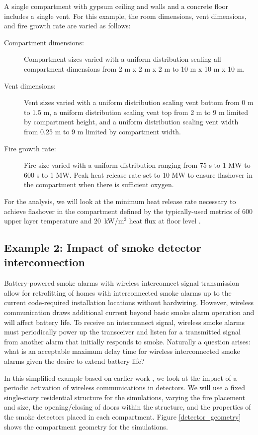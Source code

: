 \documentclass[12pt,twoside]{book}
\begin{document}
A single compartment with gypsum ceiling and walls and a concrete floor includes a single vent. For this example, the room dimensions, vent dimensions, and fire growth rate are varied as follows:

\begin{description}
\item[Compartment dimensions:] Compartment sizes varied with a uniform distribution scaling all compartment dimensions from 2 m x 2 m x 2 m to 10 m x 10 m x 10 m.
\item[Vent dimensions:] Vent sizes varied with a uniform distribution scaling vent bottom from 0 m to 1.5 m, a uniform distribution scaling vent top from 2 m to 9 m limited by compartment height, and a uniform distribution scaling vent width from 0.25 m to 9 m limited by compartment width.
\item[Fire growth rate:] Fire size varied with a uniform distribution ranging from 75 s to 1 MW to 600 s to 1 MW. Peak heat release rate set to 10 MW to ensure flashover in the compartment when there is sufficient oxygen.
\end{description}

For the analysis, we will look at the minimum heat release rate necessary to achieve flashover in the compartment defined by the typically-used metrics of 600 \degc upper layer temperature and 20~kW/m$^2$ heat flux at floor level \cite{Valid:Peacock_Flashover_1} \cite{Valid:Peacock_Flashover_2}.

\subsection{Example 2: Impact of smoke detector interconnection}

Battery-powered smoke alarms with wireless interconnect signal transmission allow for retrofitting of homes with interconnected smoke alarms up to the current code-required installation locations without hardwiring. However, wireless communication draws additional current beyond basic smoke alarm operation and will affect battery life. To receive an interconnect signal, wireless smoke alarms must periodically power up the transceiver and listen for a transmitted signal from another alarm that initially responds to smoke. Naturally a question arises: what is an acceptable maximum delay time for wireless interconnected smoke alarms given the desire to extend battery life?

In this simplified example based on earlier work \cite{Cleary_2019}, we look at the impact of a periodic activation of wireless communications in detectors. We will use a fixed single-story residential structure for the simulations, varying the fire placement and size, the opening/closing of doors within the structure, and the properties of the smoke detectors placed in each compartment. Figure \ref{detector_geometry} shows the compartment geometry for the simulations.
\end{document}
